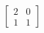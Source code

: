 \documentclass[preview]{standalone}
\begin{document}
\begin{align*}
\begin{bmatrix}2 & 0\\1 & 1\end{bmatrix}
\end{align*}
\end{document}
